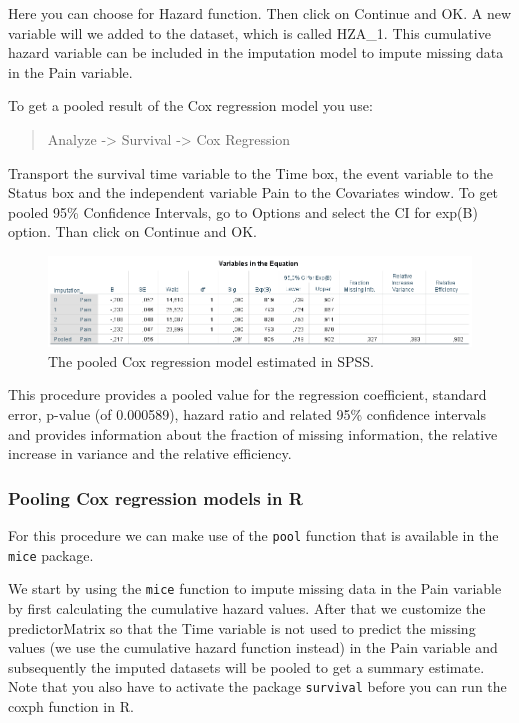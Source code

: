 \documentclass[
]{book}
\begin{document}
Here you can choose for Hazard function. Then click on Continue and OK. A new variable will we added to the dataset, which is called HZA\_1. This cumulative hazard variable can be included in the imputation model to impute missing data in the Pain variable.

To get a pooled result of the Cox regression model you use:

\begin{quote}
Analyze -\textgreater{} Survival -\textgreater{} Cox Regression
\end{quote}

Transport the survival time variable to the Time box, the event variable to the Status box and the independent variable Pain to the Covariates window. To get pooled 95\% Confidence Intervals, go to Options and select the CI for exp(B) option. Than click on Continue and OK.

\begin{figure}

{\centering \includegraphics[width=0.9\linewidth]{images/table5.10} 

}

\caption{The pooled Cox regression model estimated in SPSS.}\label{fig:tab5-10}
\end{figure}

This procedure provides a pooled value for the regression coefficient, standard error, p-value (of 0.000589), hazard ratio and related 95\% confidence intervals and provides information about the fraction of missing information, the relative increase in variance and the relative efficiency.

\hypertarget{pooling-cox-regression-models-in-r}{%
\subsubsection{Pooling Cox regression models in R}\label{pooling-cox-regression-models-in-r}}

For this procedure we can make use of the \texttt{pool} function that is available in the \texttt{mice} package.

We start by using the \texttt{mice} function to impute missing data in the Pain variable by first calculating the cumulative hazard values. After that we customize the predictorMatrix so that the Time variable is not used to predict the missing values (we use the cumulative hazard function instead) in the Pain variable and subsequently the imputed datasets will be pooled to get a summary estimate. Note that you also have to activate the package \texttt{survival} before you can run the coxph function in R.
\end{document}
